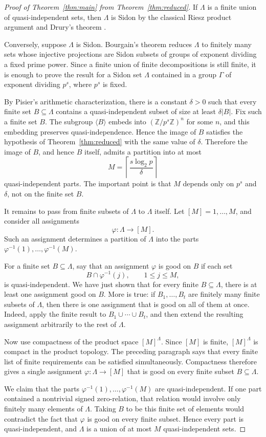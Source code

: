 \documentclass[11pt]{amsart}
\newcommand{\Z}{\mathbb{Z}}
\begin{document}
\begin{proof}[Proof of Theorem~\ref{thm:main} from Theorem~\ref{thm:reduced}]
If $\Lambda$ is a finite union of quasi-independent sets, then $\Lambda$ is Sidon by the classical Riesz product argument and Drury's theorem \cite{Drury}.

Conversely, suppose $\Lambda$ is Sidon. Bourgain's theorem reduces $\Lambda$ to finitely many sets whose injective projections are Sidon subsets of groups of exponent dividing a fixed prime power. Since a finite union of finite decompositions is still finite, it is enough to prove the result for a Sidon set $\Lambda$ contained in a group $\Gamma$ of exponent dividing $p^s$, where $p^s$ is fixed.

By Pisier's arithmetic characterization, there is a constant $\delta>0$ such that every finite set $B\subseteq\Lambda$ contains a quasi-independent subset of size at least $\delta |B|$. Fix such a finite set $B$. The subgroup $\langle B\rangle$ embeds into $(\Z/p^s\Z)^n$ for some $n$, and this embedding preserves quasi-independence. Hence the image of $B$ satisfies the hypothesis of Theorem~\ref{thm:reduced} with the same value of $\delta$. Therefore the image of $B$, and hence $B$ itself, admits a partition into at most
$$
M=\left\lceil \frac{s\log_2 p}{\delta}\right\rceil
$$
quasi-independent parts. The important point is that $M$ depends only on $p^s$ and $\delta$, not on the finite set $B$.

It remains to pass from finite subsets of $\Lambda$ to $\Lambda$ itself. Let $[M]={1,\ldots,M}$, and consider all assignments
$$
\varphi:\Lambda\to [M].
$$
Such an assignment determines a partition of $\Lambda$ into the parts $\varphi^{-1}(1),\ldots,\varphi^{-1}(M)$.

For a finite set $B\subseteq\Lambda$, say that an assignment $\varphi$ is good on $B$ if each set
$$
B\cap \varphi^{-1}(j),
\qquad 1\leq j\leq M,
$$
is quasi-independent. We have just shown that for every finite $B\subseteq\Lambda$, there is at least one assignment good on $B$. More is true: if $B_1,\ldots,B_t$ are finitely many finite subsets of $\Lambda$, then there is one assignment that is good on all of them at once. Indeed, apply the finite result to $B_1\cup\cdots\cup B_t$, and then extend the resulting assignment arbitrarily to the rest of $\Lambda$.

Now use compactness of the product space $[M]^\Lambda$. Since $[M]$ is finite, $[M]^\Lambda$ is compact in the product topology. The preceding paragraph says that every finite list of finite requirements can be satisfied simultaneously. Compactness therefore gives a single assignment $\varphi:\Lambda\to[M]$ that is good on every finite subset $B\subseteq\Lambda$.

We claim that the parts $\varphi^{-1}(1),\ldots,\varphi^{-1}(M)$ are quasi-independent. If one part contained a nontrivial signed zero-relation, that relation would involve only finitely many elements of $\Lambda$. Taking $B$ to be this finite set of elements would contradict the fact that $\varphi$ is good on every finite subset. Hence every part is quasi-independent, and $\Lambda$ is a union of at most $M$ quasi-independent sets.
\end{proof}
\end{document}
